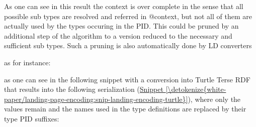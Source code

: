 \documentclass[a4paper,10pt,english]{sphinxmanual}
\begin{document}
As one can see in this result the context is over complete in the sense
that all possible sub types are resolved and referred in @context, but
not all of them are actually used by the types occuring in the PID. This
could be pruned by an additional step of the algorithm to a version
reduced to the necessary and sufficient sub types. Such a pruning is
also automatically done by LD converters%
\begin{footnote}[1]\sphinxAtStartFootnote
as for instance: 
%
\end{footnote} as one can
see in the following snippet with a conversion into Turtle Terse RDF
that results into the following serialization
(\hyperref[\detokenize{white-paper/landing-page-encoding:snip-landing-encoding-turtle}]{Snippet \ref{\detokenize{white-paper/landing-page-encoding:snip-landing-encoding-turtle}}}), where only the values remain
and the names used in the type definitions are replaced by their type
PID suffixes:
\def\sphinxLiteralBlockLabel{\label{\detokenize{white-paper/landing-page-encoding:id5}}\label{\detokenize{white-paper/landing-page-encoding:snip-landing-encoding-turtle}}}
\end{document}
